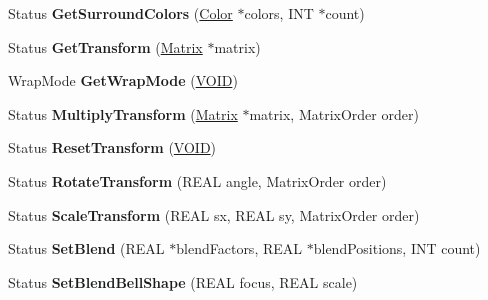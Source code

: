 \begin{DoxyCompactItemize}
\item 
\mbox{\label{class_path_gradient_brush_a0cf8ba8f50650b50cff525852c92312f}} 
Status {\bfseries Get\+Surround\+Colors} (\hyperlink{struct_color}{Color} $\ast$colors, I\+NT $\ast$count)
\item 
\mbox{\label{class_path_gradient_brush_ac2d089ae7b78c51fd21944595dc112a1}} 
Status {\bfseries Get\+Transform} (\hyperlink{class_matrix}{Matrix} $\ast$matrix)
\item 
\mbox{\label{class_path_gradient_brush_afbfa9cf7223bcf74343a0f7108e09ca6}} 
Wrap\+Mode {\bfseries Get\+Wrap\+Mode} (\hyperlink{interfacevoid}{V\+O\+ID})
\item 
\mbox{\label{class_path_gradient_brush_a106d3dc798adf76e7a429568dcd0146c}} 
Status {\bfseries Multiply\+Transform} (\hyperlink{class_matrix}{Matrix} $\ast$matrix, Matrix\+Order order)
\item 
\mbox{\label{class_path_gradient_brush_a2381581307f6c38636f47dbee8960571}} 
Status {\bfseries Reset\+Transform} (\hyperlink{interfacevoid}{V\+O\+ID})
\item 
\mbox{\label{class_path_gradient_brush_a1c777bd5bffda2acc6d8abaf73fd759c}} 
Status {\bfseries Rotate\+Transform} (R\+E\+AL angle, Matrix\+Order order)
\item 
\mbox{\label{class_path_gradient_brush_adaf0e34eb0481646dd3e3d24b27670d2}} 
Status {\bfseries Scale\+Transform} (R\+E\+AL sx, R\+E\+AL sy, Matrix\+Order order)
\item 
\mbox{\label{class_path_gradient_brush_a5b2b8053e91b3a80c425fef6ec9fc1e2}} 
Status {\bfseries Set\+Blend} (R\+E\+AL $\ast$blend\+Factors, R\+E\+AL $\ast$blend\+Positions, I\+NT count)
\item 
\mbox{\label{class_path_gradient_brush_ac9fd75439831598ae8c7b6f4ddc84fa0}} 
Status {\bfseries Set\+Blend\+Bell\+Shape} (R\+E\+AL focus, R\+E\+AL scale)
\item 

\end{DoxyCompactItemize}
